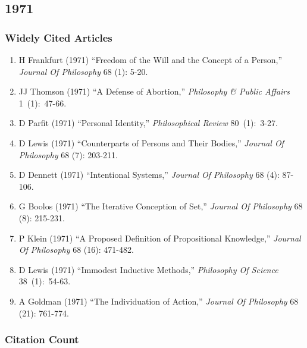 \documentclass[
  10pt,
  letterpaper,
  DIV=11,
  numbers=noendperiod,
  twoside]{scrartcl}
\providecommand{\tightlist}{%
  \setlength{\itemsep}{0pt}\setlength{\parskip}{0pt}}\usepackage{longtable,booktabs,array}
\begin{document}
\newpage

\subsection{1971}\label{sec-s1971}

\subsubsection*{Widely Cited Articles}\label{widely-cited-articles-15}

\begin{enumerate}
\def\labelenumi{\arabic{enumi}.}
\tightlist
\item
  H Frankfurt (1971) ``Freedom of the Will and the Concept of a
  Person,'' \emph{Journal Of Philosophy} 68 (1): 5-20.
\item
  JJ Thomson (1971) ``A Defense of Abortion,'' \emph{Philosophy \&
  Public Affairs} 1~(1):~47-66.
\item
  D Parfit (1971) ``Personal Identity,'' \emph{Philosophical Review}
  80~(1):~3-27.
\item
  D Lewis (1971) ``Counterparts of Persons and Their Bodies,''
  \emph{Journal Of Philosophy} 68 (7): 203-211.
\item
  D Dennett (1971) ``Intentional Systems,'' \emph{Journal Of Philosophy}
  68 (4): 87-106.
\item
  G Boolos (1971) ``The Iterative Conception of Set,'' \emph{Journal Of
  Philosophy} 68 (8): 215-231.
\item
  P Klein (1971) ``A Proposed Definition of Propositional Knowledge,''
  \emph{Journal Of Philosophy} 68 (16): 471-482.
\item
  D Lewis (1971) ``Immodest Inductive Methods,'' \emph{Philosophy Of
  Science} 38~(1):~54-63.
\item
  A Goldman (1971) ``The Individuation of Action,'' \emph{Journal Of
  Philosophy} 68 (21): 761-774.
\end{enumerate}

\subsubsection*{Citation Count}\label{sec-count-1971}
\end{document}
